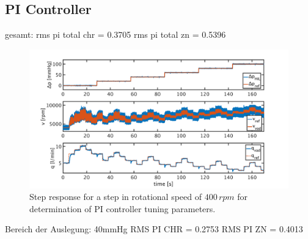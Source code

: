 \subsection{PI Controller}
gesamt:
rms pi total chr = 0.3705
rms pi total zn = 0.5396
\begin{figure}[ht]
  \centering
  \includegraphics[width=\textwidth]{images/chapt_5/pi_contr_chr.pdf}
  \caption[Step response for determination of PI controller tuning parameters]{Step response for a step in rotational speed of $400\,rpm$ for determination of PI controller tuning parameters.}
  \label{fig:pi_contr_chr}
\end{figure}


Bereich der Auslegung: 40mmHg
RMS PI CHR = 0.2753
RMS PI ZN = 0.4013


